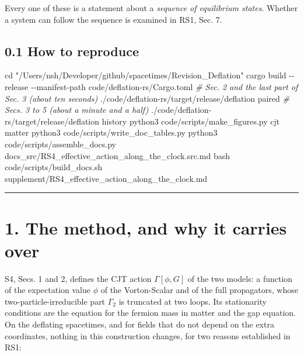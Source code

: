 \documentclass[
  10pt,
]{article}
\newenvironment{Shaded}{}{}
\newcommand{\AttributeTok}[1]{\textcolor[rgb]{0.49,0.56,0.16}{#1}}
\newcommand{\BuiltInTok}[1]{\textcolor[rgb]{0.00,0.50,0.00}{#1}}
\newcommand{\CommentTok}[1]{\textcolor[rgb]{0.38,0.63,0.69}{\textit{#1}}}
\newcommand{\ExtensionTok}[1]{#1}
\newcommand{\FunctionTok}[1]{\textcolor[rgb]{0.02,0.16,0.49}{#1}}
\newcommand{\NormalTok}[1]{#1}
\newcommand{\StringTok}[1]{\textcolor[rgb]{0.25,0.44,0.63}{#1}}
\begin{document}
Every one of these is a statement about a \emph{sequence of equilibrium
states}. Whether a system can follow the sequence is examined in RS1,
Sec. 7.

\hypertarget{how-to-reproduce}{%
\subsection{0.1 How to reproduce}\label{how-to-reproduce}}

\begin{Shaded}
\begin{Highlighting}[]
\BuiltInTok{cd} \StringTok{"/Users/nsh/Developer/github/spacetimes/Revision\_Deflation"}
\ExtensionTok{cargo}\NormalTok{ build }\AttributeTok{{-}{-}release} \AttributeTok{{-}{-}manifest{-}path}\NormalTok{ code/deflation{-}rs/Cargo.toml}
\CommentTok{\# Sec. 2 and the last part of Sec. 3 (about ten seconds)}
\ExtensionTok{./code/deflation{-}rs/target/release/deflation}\NormalTok{ paired}
\CommentTok{\# Secs. 3 to 5 (about a minute and a half)}
\ExtensionTok{./code/deflation{-}rs/target/release/deflation}\NormalTok{ history}
\ExtensionTok{python3}\NormalTok{ code/scripts/make\_figures.py cjt matter}
\ExtensionTok{python3}\NormalTok{ code/scripts/write\_doc\_tables.py}
\ExtensionTok{python3}\NormalTok{ code/scripts/assemble\_docs.py docs\_src/RS4\_effective\_action\_along\_the\_clock.src.md}
\FunctionTok{bash}\NormalTok{ code/scripts/build\_docs.sh supplement/RS4\_effective\_action\_along\_the\_clock.md}
\end{Highlighting}
\end{Shaded}

\begin{center}\rule{0.5\linewidth}{0.5pt}\end{center}

\hypertarget{the-method-and-why-it-carries-over}{%
\section{1. The method, and why it carries
over}\label{the-method-and-why-it-carries-over}}

S4, Secs. 1 and 2, defines the CJT action \(\Gamma[\phi,G]\) of the two
models: a function of the expectation value \(\phi\) of the
Vorton-Scalar and of the full propagators, whose
two-particle-irreducible part \(\Gamma_2\) is truncated at two loops.
Its stationarity conditions are the equation for the fermion mass in
matter and the gap equation. On the deflating spacetimes, and for fields
that do not depend on the extra coordinates, nothing in this
construction changes, for two reasons established in RS1:
\end{document}
